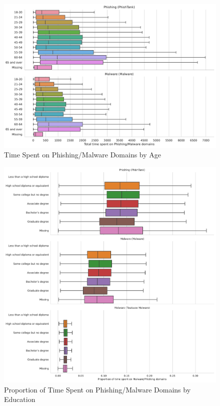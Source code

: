 \documentclass[12pt, letterpaper]{article}
\begin{document}
\begin{figure}[!htb]
	 \centering
	 \caption{Time Spent on Phishing/Malware Domains by Age}
	 \label{fig:prop_total_time_phishing_malware_age}
	 \includegraphics[width=\textwidth]{figs/total_time_phishing_malware_age.pdf}
\end{figure}

\begin{figure}[!htb]
\centering
\caption{Proportion of Time Spent on Phishing/Malware Domains by Education}
	\label{fig:prop_total_time_phishing_malware_educ}
	\includegraphics[width=\textwidth]{figs/prop_total_time_phishing_malware_tl_educ.pdf}
\end{figure}
\end{document}
